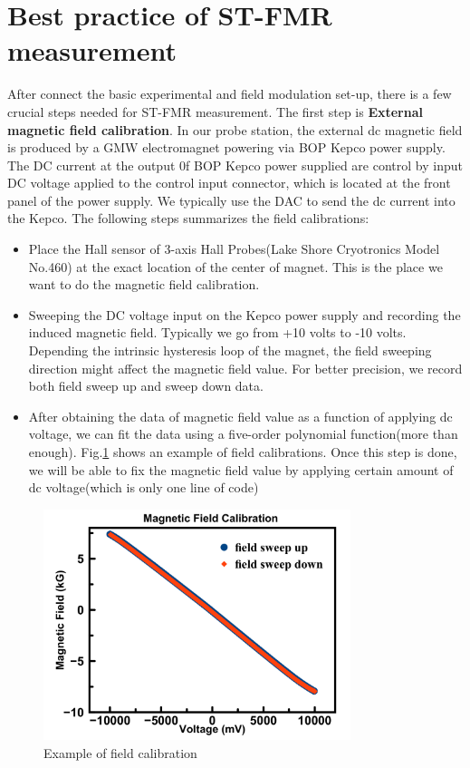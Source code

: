 \clearpage

\section{Best practice of ST-FMR measurement}

After connect the basic experimental and field modulation set-up, there is a few crucial steps needed for ST-FMR measurement. The first step is \textbf{External magnetic field calibration}. In our probe station, the external dc magnetic field is produced by a GMW electromagnet powering via BOP Kepco power supply. The DC current at the output 0f BOP Kepco power supplied are control by input DC voltage applied to the control input connector, which is located at the front panel of the power supply. We typically use the DAC to send the dc current into the Kepco. The following steps summarizes the field calibrations:

\begin{itemize}
  \item Place the Hall sensor of 3-axis Hall Probes(Lake Shore Cryotronics Model No.460) at the exact location of the center of magnet. This is the place we want to do the magnetic field calibration.
  \item Sweeping the DC voltage input on the Kepco power supply and recording the induced magnetic field. Typically we go from +10 volts to -10 volts. Depending the intrinsic hysteresis loop of the magnet, the field sweeping direction might affect the magnetic field value. For better precision, we record both field sweep up and sweep down data.
  \item After obtaining the data of magnetic field value as a function of applying dc voltage, we can fit the data using a five-order polynomial function(more than enough). Fig.\ref{fig:fieldcal} shows an example of field calibrations. Once this step is done, we will be able to fix the magnetic field value by applying certain amount of dc voltage(which is only one line of code)
\end{itemize}

\begin{figure}[t]
  \centering
  \includegraphics[width=0.8\textwidth]{fig/appendix/fieldCal.png}
  \caption{Example of field calibration}
  \label{fig:fieldcal}
\end{figure}


